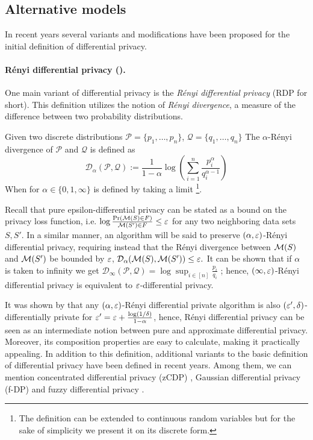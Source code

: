 \documentclass[12pt,a4paper,oneside,onecolumn]{book}
\begin{document}
\subsection{Alternative models}
In recent years several variants and modifications have been proposed for the initial definition of differential privacy. 
%
%

\paragraph{Rényi differential privacy (\cite{DBLP:journals/corr/Mironov17}).} 
One main variant of differential privacy is the \emph{Rényi differential privacy} (RDP for short). This definition utilizes the notion of \emph{Rényi divergence}, a measure of the difference between two probability distributions. 

\begin{definition}
    Given two discrete distributions 
    $\mathcal{P} = \{p_1,\ldots,p_n\}$, $\mathcal{Q} = \{q_1,\ldots,q_n\}$
    The $\alpha$-Rényi divergence of $\mathcal{P}$ and $\mathcal{Q}$ is defined as
    \[
        \mathcal{D}_{\alpha}(\mathcal{P}, \mathcal{Q}) := 
        \frac{1}{1-\alpha}\log\left(\sum_{i=1}^{n}\frac{p^\alpha_i}{q^{\alpha-1}_i}\right)
    \]
    When for $\alpha \in \{0,1,\infty\}$ is defined by taking a limit \footnote{The definition can be extended to continuous random variables but for the sake of simplicity we present it on its discrete form.}.
\end{definition}

Recall that pure epsilon-differential privacy can be stated as a bound on the privacy loss function, i.e. 
$\log\frac{\Pr(\mathcal{M}(S)\in F)}{\mathcal{M}(S')\in F} \leq \varepsilon$
for any two neighboring data sets $S,S'$. 
In a similar manner, an algorithm will be said to preserve $(\alpha,\varepsilon)$-Rényi differential privacy, requiring instead that the Rényi divergence between $\mathcal{M}(S)$ and $\mathcal{M}(S')$ be bounded by $\varepsilon$, 
$
\mathcal{D}_{\alpha}(\mathcal{M}(S), \mathcal{M}(S')) \leq \varepsilon.
$
It can be shown that if $\alpha$ is taken to infinity we get 
$
        \mathcal{D}_{\infty}(\mathcal{P}, \mathcal{Q}) = 
        \log \sup_{i\in [n]}  \frac{p_i}{q_i}
$ \citep{DBLP:journals/corr/abs-1206-2459}; 
hence, $(\infty, \varepsilon)$-Rényi differential privacy is equivalent to $\varepsilon$-differential privacy.  %

It was shown by \cite{DBLP:journals/corr/Mironov17} that any $(\alpha, \varepsilon)$-Rényi differential private algorithm is also $(\varepsilon', \delta)$-differentially private for 
$\varepsilon' = \varepsilon + \frac{\log(1/\delta)}{1-\alpha}$, 
hence, Rényi differential privacy can be seen as an intermediate notion between pure and approximate differential privacy. 
Moreover, its composition properties are easy to calculate, making it practically appealing. 
In addition to this definition, additional variants to the basic definition of differential privacy have been defined in recent years. 
Among them, we can mention concentrated differential privacy (zCDP) \citep{DBLP:journals/corr/BunS16}, Gaussian differential privacy (f-DP) \citep{DBLP:journals/corr/abs-1905-02383} and fuzzy differential privacy \citep{9730083}.
\end{document}
